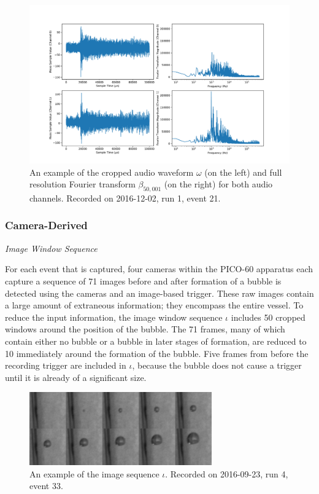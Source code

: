 \documentclass[10pt]{article}
\begin{document}
\begin{figure}[h]
    \centering
    \includegraphics[width=\textwidth]{audio}
    \caption{\label{} An example of the cropped audio waveform $\omega$ (on the left) and full resolution Fourier transform $\beta_{50,001}$ (on the right) for both audio channels. Recorded on 2016-12-02, run 1, event 21.}
\end{figure}

\subsubsection{Camera-Derived}

\textit{Image Window Sequence}

For each event that is captured, four cameras within the PICO-60 apparatus each capture a sequence of 71 images before and after formation of a bubble is detected using the cameras and an image-based trigger. These raw images contain a large amount of extraneous information; they encompass the entire vessel. To reduce the input information, the image window sequence $\iota$ includes 50 cropped windows around the position of the bubble. The 71 frames, many of which contain either no bubble or a bubble in later stages of formation, are reduced to 10 immediately around the formation of the bubble. Five frames from before the recording trigger are included in $\iota$, because the bubble does not cause a trigger until it is already of a significant size.

\begin{figure}[h]
    \centering
    \includegraphics[width=0.7\textwidth]{image_grid}
    \caption{\label{} An example of the image sequence $\iota$. Recorded on 2016-09-23, run 4, event 33.}
\end{figure}
\end{document}
